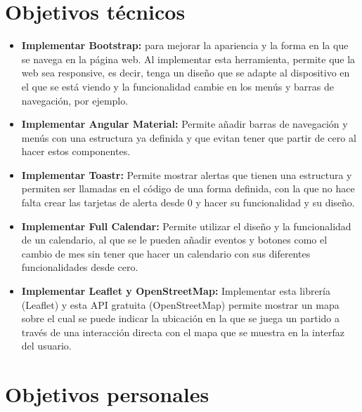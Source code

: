 \section{Objetivos técnicos}\label{objetivos-tecnicos}

\begin{itemize}
\tightlist
\item
\textbf{Implementar Bootstrap:} para mejorar la apariencia y la forma en la que se navega en la página web. Al implementar esta herramienta, permite que la web sea responsive, es decir, tenga un diseño que se adapte al dispositivo en el que se está viendo y la funcionalidad cambie en los menús y barras de navegación, por ejemplo.

\item
\textbf{Implementar Angular Material:} Permite añadir barras de navegación y menús con una estructura ya definida y que evitan tener que partir de cero al hacer estos componentes.

\item
\textbf{Implementar Toastr:} Permite mostrar alertas que tienen una estructura y permiten ser llamadas en el código de una forma definida, con la que no hace falta crear las tarjetas de alerta desde 0 y hacer su funcionalidad y su diseño.

\item
\textbf{Implementar Full Calendar:} Permite utilizar el diseño y la funcionalidad de un calendario, al que se le pueden añadir eventos y botones como el cambio de mes sin tener que hacer un calendario con sus diferentes funcionalidades desde cero.

\item
\textbf{Implementar Leaflet y OpenStreetMap:} Implementar esta librería (Leaflet) y esta API gratuita (OpenStreetMap) permite mostrar un mapa sobre el cual se puede indicar la ubicación en la que se juega un partido a través de una interacción directa con el mapa que se muestra en la interfaz del usuario.
\end{itemize}


\section{Objetivos personales}\label{objetivos-personales}

